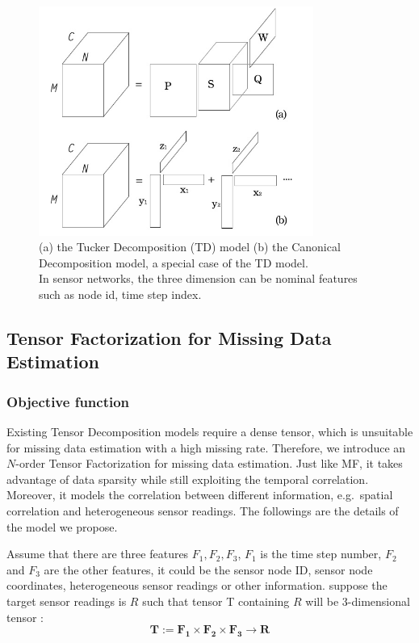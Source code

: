 \begin{figure}[h] 
\includegraphics[width=9cm]{tf.jpg} 
\caption{ (a) the Tucker Decomposition (TD) model (b) the Canonical Decomposition model, a special case of the TD model.\\
In sensor networks, the three dimension can be nominal features such as node id, time step index. \label{fig:tf:tuckcanon} }
\end{figure}

\subsection{Tensor Factorization for Missing Data Estimation} \label{sec:tfmissing}
\subsubsection{Objective function}

Existing Tensor Decomposition models require a dense tensor, which is unsuitable for missing data estimation with a high missing rate.
Therefore, we introduce an $N$-order Tensor Factorization for missing data estimation.
Just like MF, it takes advantage of data sparsity while still exploiting the temporal correlation.
Moreover, it models the correlation between different information, e.g.\ spatial correlation and heterogeneous sensor readings.
The followings are the details of the model we propose.

Assume that there are three features $F_1, F_2 , F_3$, $F_1$ is the time step number, $F_2$ and $F_3$ are the other features, it could be the sensor node ID, sensor node coordinates, heterogeneous sensor readings or other information.
suppose the target sensor readings is $R$ such that tensor T containing  $R$ will be 3-dimensional tensor :
\begin{equation*}
\mathbf{T} := \mathbf{F_1} \times  \mathbf{F_2} \times \mathbf{F_3} \rightarrow \mathbf{R}
\end{equation*}

